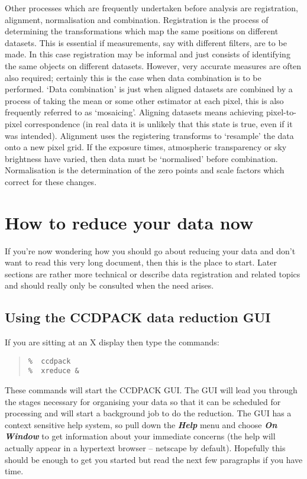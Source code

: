 \documentclass[twoside,11pt]{article}
\newcommand{\xlabel}[1]{}
\renewcommand{\_}{\texttt{\symbol{95}}}
\newenvironment{myquote}{\begin{quote}\begin{small}}{\end{small}\end{quote}}
\newcommand{\menu}[1]{{\small \bf \em #1}}
\begin{document}
Other processes which are frequently undertaken before analysis are
registration, alignment, normalisation and combination. Registration is
the process of determining the transformations which map the same
positions on different datasets. This is essential if measurements, say
with different filters, are to be made. In this case registration may be
informal and just consists of identifying the same objects on different
datasets. However, very accurate measures are often also required;
certainly this is the case when data combination is to be performed.
`Data combination' is just when aligned datasets are combined by a
process of taking the mean or some other estimator at each pixel, this
is also frequently referred to as `mosaicing'. Aligning datasets
means achieving pixel-to-pixel correspondence (in real data it is
unlikely that this state is true, even if it was intended).
Alignment uses the registering transforms to `resample' the data onto
a new pixel grid. If the exposure times, atmospheric transparency or
sky brightness have varied, then data must be `normalised' before
combination. Normalisation is the determination of the zero points and
scale factors which correct for these changes.

\section{How to reduce your data now}

If you're now wondering how you should go about reducing your data and
don't want to read this very long document, then this is the place to
start. Later sections are rather more technical or describe data
registration and related topics and should really only be consulted
when the need arises.

\subsection{Using the CCDPACK data reduction GUI \xlabel{usingxreduce}}

If you are sitting at an X display then type the commands:
\begin{myquote}
\begin{verbatim}
%  ccdpack
%  xreduce &
\end{verbatim}
\end{myquote}
These commands will start the CCDPACK GUI.  The GUI will lead you
through the stages necessary for organising your data so that it can
be scheduled for processing and will start a background job to do the
reduction.  The GUI has a context sensitive help system, so pull down
the \menu{Help} menu and choose \menu{On Window} to get information
about your immediate concerns (the help will actually appear in a
hypertext browser -- netscape by default). Hopefully this should be
enough to get you started but read the next few paragraphs if you have
time.
\end{document}

